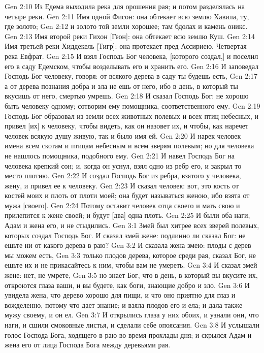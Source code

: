 \vs Gen 2:10 Из Едема выходила река для орошения рая; и потом разделялась на четыре реки.
\vs Gen 2:11 Имя одной Фисон: она обтекает всю землю Хавила, ту, где золото;
\vs Gen 2:12 и золото той земли хорошее; там бдолах и камень оникс.
\vs Gen 2:13 Имя второй реки Гихон [Геон]: она обтекает всю землю Куш.
\vs Gen 2:14 Имя третьей реки Хиддекель [Тигр]: она протекает пред Ассириею. Четвертая река Евфрат.
\vs Gen 2:15 И взял Господь Бог человека, [которого создал,] и поселил его в саду Едемском, чтобы возделывать его и хранить его.
\vs Gen 2:16 И заповедал Господь Бог человеку, говоря: от всякого дерева в саду ты будешь есть,
\vs Gen 2:17 а от дерева познания добра и зла не ешь от него, ибо в день, в который ты вкусишь от него, смертью умрешь.
\vs Gen 2:18 И сказал Господь Бог: не хорошо быть человеку одному; сотворим ему помощника, соответственного ему.
\vs Gen 2:19 Господь Бог образовал из земли всех животных полевых и всех птиц небесных, и привел [их] к человеку, чтобы видеть, как он назовет их, и чтобы, как наречет человек всякую душу живую, так и было имя ей.
\vs Gen 2:20 И нарек человек имена всем скотам и птицам небесным и всем зверям полевым; но для человека не нашлось помощника, подобного ему.
\vs Gen 2:21 И навел Господь Бог на человека крепкий сон; и, когда он уснул, взял одно из ребр его, и закрыл то место плотию.
\vs Gen 2:22 И создал Господь Бог из ребра, взятого у человека, жену, и привел ее к человеку.
\vs Gen 2:23 И сказал человек: вот, это кость от костей моих и плоть от плоти моей; она будет называться женою, ибо взята от мужа [своего].
\vs Gen 2:24 Потому оставит человек отца своего и мать свою и прилепится к жене своей; и будут [два] одна плоть.
\vs Gen 2:25 И были оба наги, Адам и жена его, и не стыдились.
\vs Gen 3:1 Змей был хитрее всех зверей полевых, которых создал Господь Бог. И сказал змей жене: подлинно ли сказал Бог: не ешьте ни от какого дерева в раю?
\vs Gen 3:2 И сказала жена змею: плоды с дерев мы можем есть,
\vs Gen 3:3 только плодов дерева, которое среди рая, сказал Бог, не ешьте их и не прикасайтесь к ним, чтобы вам не умереть.
\vs Gen 3:4 И сказал змей жене: нет, не умрете,
\vs Gen 3:5 но знает Бог, что в день, в который вы вкусите их, откроются глаза ваши, и вы будете, как боги, знающие добро и зло.
\vs Gen 3:6 И увидела жена, что дерево хорошо для пищи, и что оно приятно для глаз и вожделенно, потому что дает знание; и взяла плодов его и ела; и дала также мужу своему, и он ел.
\vs Gen 3:7 И открылись глаза у них обоих, и узнали они, что наги, и сшили смоковные листья, и сделали себе опоясания.
\rsbpar\vs Gen 3:8 И услышали голос Господа Бога, ходящего в раю во время прохлады дня; и скрылся Адам и жена его от лица Господа Бога между деревьями рая.
